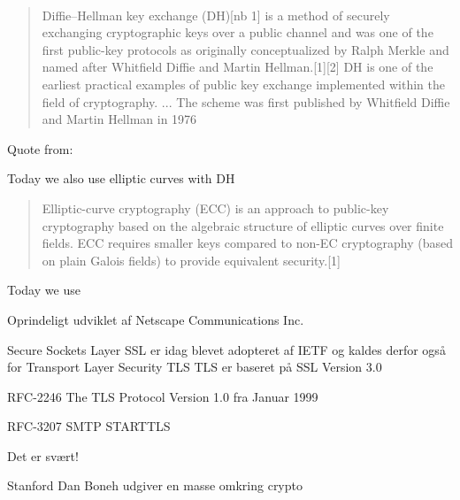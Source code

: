 \documentclass[Screen16to9,17pt]{foils}
\begin{document}

{~}

\begin{quote}
Diffie–Hellman key exchange (DH)[nb 1] is a method of securely exchanging cryptographic keys over a public channel and was one of the first public-key protocols as originally conceptualized by Ralph Merkle and named after Whitfield Diffie and Martin Hellman.[1][2] DH is one of the earliest practical examples of public key exchange implemented within the field of cryptography.
... The scheme was first published by Whitfield Diffie and Martin Hellman in 1976
\end{quote}

\begin{list2}
\item Quote from: {\small {}}
\item Today we also use elliptic curves with DH \\{\small {}}
\end{list2}


\begin{quote}
Elliptic-curve cryptography (ECC) is an approach to public-key cryptography based on the algebraic structure of elliptic curves over finite fields. ECC requires smaller keys compared to non-EC cryptography (based on plain Galois fields) to provide equivalent security.[1]
\end{quote}

\begin{list2}
\item Today we use 
\end{list2}





\begin{list1}
\item Oprindeligt udviklet af Netscape Communications Inc.
\item Secure Sockets Layer SSL er idag blevet adopteret af IETF og kaldes
derfor også for Transport Layer Security TLS
TLS er baseret på SSL Version 3.0
\item RFC-2246 The TLS Protocol Version 1.0 fra Januar 1999
\item RFC-3207 SMTP STARTTLS
\item Det er svært!
\item Stanford Dan Boneh udgiver en masse omkring crypto\\ 
\end{list1}
\end{document}
